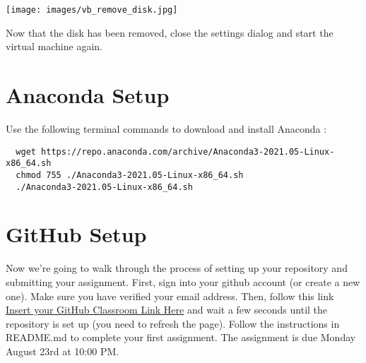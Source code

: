 \documentclass{article}
\begin{document}
\begin{center}
\texttt{[image: images/vb\_remove\_disk.jpg]}
\end{center}

Now that the disk has been removed, close the settings dialog and start the virtual machine again.

\section{Anaconda Setup} \label{sec:anacondasetup}
\noindent Use the following terminal commands to download and install Anaconda :\\
\begin{verbatim}
  wget https://repo.anaconda.com/archive/Anaconda3-2021.05-Linux-x86_64.sh
  chmod 755 ./Anaconda3-2021.05-Linux-x86_64.sh
  ./Anaconda3-2021.05-Linux-x86_64.sh
\end{verbatim}

\section{GitHub Setup}

Now we're going to walk through the process of setting up your repository and submitting your assignment. First, sign into your github account (or create a new one). Make sure you have verified your email address. Then, follow this link \url{Insert your GitHub Classroom Link Here} and wait a few seconds until the repository is set up (you need to refresh the page). Follow the instructions in README.md to complete your first assignment. The assignment is due Monday August 23rd at 10:00 PM.
\end{document}

